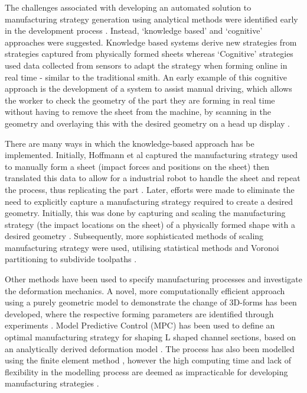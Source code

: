 The challenges associated with developing an automated solution to manufacturing strategy generation using analytical methods were identified early in the development process \citep{Golle2007DrivingProducts}. Instead, `knowledge based' and `cognitive' approaches were suggested. Knowledge based systems derive new strategies from strategies captured from physically formed sheets whereas `Cognitive' strategies used data collected from sensors to adapt the strategy when forming online in real time - similar to the traditional smith. An early example of this cognitive approach is the development of a system to assist manual driving, which allows the worker to check the geometry of the part they are forming in real time without having to remove the sheet from the machine, by scanning in the geometry and overlaying this with the desired geometry on a head up display \citep{Scherer2010DrivingProducts}.

There are many ways in which the knowledge-based approach has be implemented. Initially, Hoffmann et al captured the manufacturing strategy used to manually form a sheet (impact forces and positions on the sheet) then translated this data to allow for a industrial robot to handle the sheet and repeat the process, thus replicating the part  \citep{Hoffman2009AnHandling}. %
Later, efforts were made to eliminate the need to explicitly capture a manufacturing strategy required to create a desired geometry. Initially, this was done by capturing and scaling the manufacturing strategy (the impact locations on the sheet) of a physically formed shape with a desired geometry \citep{Opritescu2012AutomatedStrategy}. Subsequently, more sophisticated methods of scaling manufacturing strategy were used, utilising statistical methods \citep{Opritescu2016VariationVariance}  and Voronoi partitioning to subdivide toolpaths \citep{Hartmann2019Knowledge-basedPartitioning}.

Other methods have been used to specify manufacturing processes and investigate the deformation mechanics. A novel, more computationally efficient approach using a purely geometric model to demonstrate the change of 3D-forms has been developed, where the respective forming parameters are identified through experiments \citep{Yang2011GeometricalProcess}. Model Predictive Control (MPC) has been used to define an optimal manufacturing strategy for shaping L shaped channel sections, based on an analytically derived deformation model \citep{Yang2009AutomatisierungProgramming}. The process has also been modelled using the finite element method \citep{Hoffmann2005StudiesMetal}, however the high computing time and lack of flexibility in the modelling process are deemed as impracticable for developing manufacturing strategies \citep{Scherer2013MethodenBlechumformung}. 

